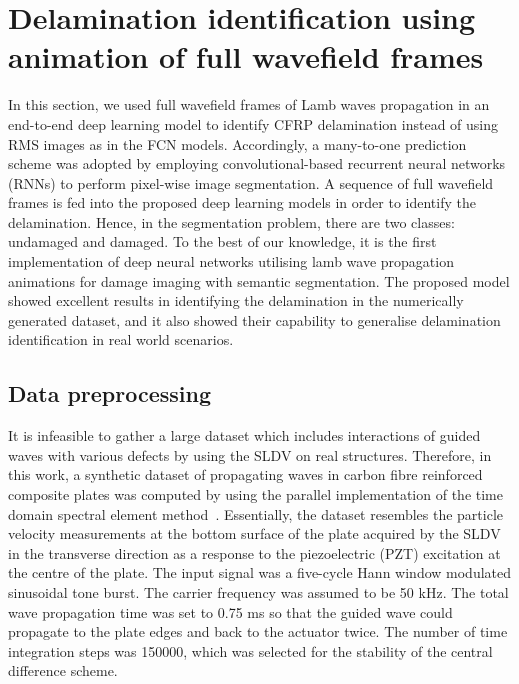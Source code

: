 \section{Delamination identification using animation of full wavefield frames}
\label{sec44}
In this section, we used full wavefield frames of Lamb waves propagation in an end-to-end deep learning model to identify CFRP delamination instead of using RMS images as in the FCN models.
Accordingly, a many-to-one prediction scheme was adopted by employing convolutional-based recurrent neural networks (RNNs) to perform pixel-wise image segmentation.
A sequence of full wavefield frames is fed into the proposed deep learning models in order to identify the delamination.
Hence, in the segmentation problem, there are two classes: undamaged and damaged.
To the best of our knowledge, it is the first implementation of deep neural networks utilising lamb wave propagation animations for damage imaging with semantic segmentation.
The proposed model showed excellent results in identifying the delamination in the numerically generated dataset, and it also showed their capability to generalise delamination identification in real world scenarios.
\subsection{Data preprocessing}
It is infeasible to gather a large dataset which includes interactions of guided waves with various defects by using the SLDV on real structures. 
Therefore, in this work, a synthetic dataset of propagating waves in carbon fibre reinforced composite plates was computed by using the parallel implementation of the time domain spectral element method~\cite{Kudela2020}. 
Essentially, the dataset resembles the particle velocity measurements at the bottom surface of the plate acquired by the SLDV in the transverse direction as a response to the piezoelectric (PZT) excitation at the centre of the plate. 
The input signal was a five-cycle Hann window modulated sinusoidal tone burst. The carrier frequency was assumed to be 50 kHz. 
The total wave propagation time was set to 0.75 ms so that the guided wave could propagate to the plate edges and back to the actuator twice.
The number of time integration steps was 150000, which was selected for the stability of the central difference scheme.

